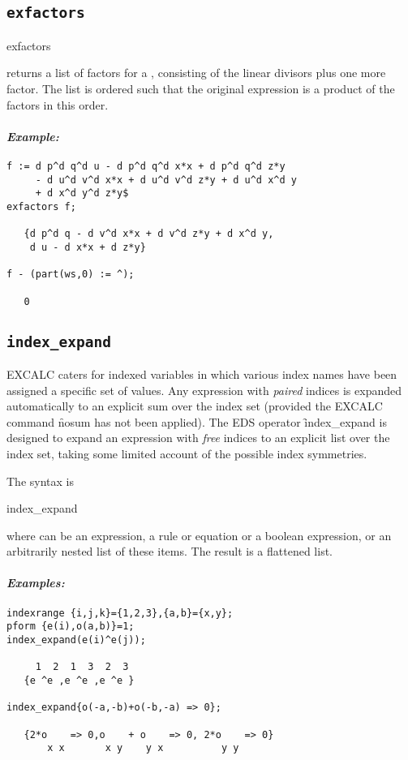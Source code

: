 \subsection{\tt exfactors}
\label{exfactors}
\begin{syntax}
	exfactors 
\end{syntax}
returns a list of factors for a , consisting of the linear
divisors plus one more factor. The list is ordered such that the original
expression is a product of the factors in this order.

\paragraph{\it Example:}
\begin{verbatim}
f := d p^d q^d u - d p^d q^d x*x + d p^d q^d z*y
     - d u^d v^d x*x + d u^d v^d z*y + d u^d x^d y
     + d x^d y^d z*y$
exfactors f;

   {d p^d q - d v^d x*x + d v^d z*y + d x^d y, 
    d u - d x*x + d z*y} 

f - (part(ws,0) := ^);

   0
\end{verbatim}

\subsection{\tt index\_expand}
\label{index_expand}

EXCALC caters for indexed variables in which various index names have been
assigned a specific set of values. Any expression with {\em paired} indices
is expanded automatically to an explicit sum over the index set (provided
the EXCALC command \f{nosum} has not been applied). The EDS operator
\f{index\_expand} is designed to expand an expression with {\em free}
indices to an explicit list over the index set, taking some limited account
of the possible index symmetries.

The syntax is
\begin{syntax}
	index\_expand 
\end{syntax}
where  can be an expression, a rule or equation or a boolean
expression, or an arbitrarily nested list of these items. The result is a
flattened list.

\paragraph{\it Examples:}
\begin{verbatim}
indexrange {i,j,k}={1,2,3},{a,b}={x,y};
pform {e(i),o(a,b)}=1;
index_expand(e(i)^e(j));

     1  2  1  3  2  3
   {e ^e ,e ^e ,e ^e }

index_expand{o(-a,-b)+o(-b,-a) => 0};

   {2*o    => 0,o    + o    => 0, 2*o    => 0}
       x x       x y    y x          y y 
\end{verbatim}


